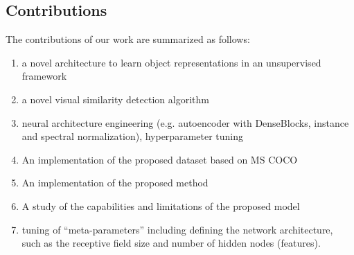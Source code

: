 \documentclass[12pt,a4paper]{article}
\begin{document}
\subsection{Contributions}
The contributions of our work are summarized as follows:
\begin{enumerate}
  \item a novel architecture to learn object representations in an unsupervised framework
  \item a novel visual similarity detection algorithm
  \item neural architecture engineering (e.g. autoencoder with DenseBlocks, instance and spectral normalization), hyperparameter tuning
  \item An implementation of the proposed dataset based on MS COCO
  \item An implementation of the proposed method
  \item A study of the capabilities and limitations of the proposed model
  \item tuning of “meta-parameters” including defining the network architecture, such as the receptive field size
and number of hidden nodes (features).
\end{enumerate}

% 
\end{document}
